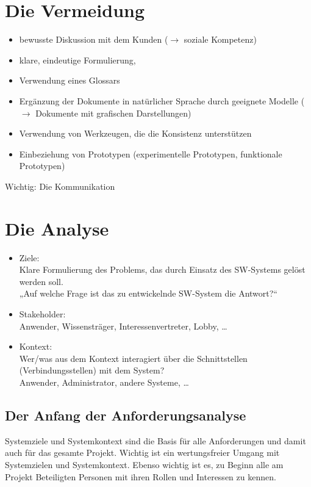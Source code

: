 \section{Die Vermeidung}
\begin{itemize}
\item bewusste Diskussion mit dem Kunden ($\to$ soziale Kompetenz)
\item klare, eindeutige Formulierung,
\item Verwendung eines Glossars
\item Ergänzung der Dokumente in natürlicher Sprache durch geeignete Modelle ($\to$ Dokumente mit grafischen Darstellungen)
\item Verwendung von Werkzeugen, die die Konsistenz unterstützen
\item  Einbeziehung von Prototypen (experimentelle Prototypen, funktionale Prototypen)
\end{itemize}
Wichtig: Die Kommunikation

\section{Die Analyse}
\begin{itemize}
\item Ziele:\\
Klare Formulierung des Problems, das durch Einsatz des SW-Systems gelöst werden soll.\\
„Auf welche Frage ist das zu entwickelnde SW-System die Antwort?“
\item Stakeholder:\\
Anwender,
Wissensträger,
Interessenvertreter,
Lobby, …
\item Kontext:\\
Wer/was aus dem Kontext interagiert über die Schnittstellen (Verbindungsstellen) mit dem System?\\
Anwender, Administrator, andere Systeme, …
\end{itemize}


\subsection{Der Anfang der Anforderungsanalyse}

Systemziele und Systemkontext sind die Basis für alle Anforderungen und damit auch für
das gesamte Projekt. Wichtig ist ein wertungsfreier Umgang mit Systemzielen und
Systemkontext. Ebenso wichtig ist es, zu Beginn alle am Projekt Beteiligten Personen mit
ihren Rollen und Interessen zu kennen.

